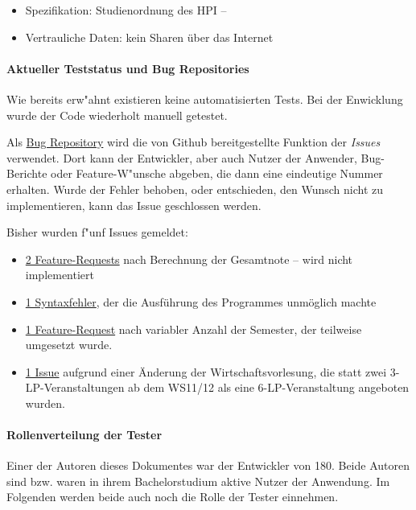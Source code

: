 \documentclass[ngerman]{article}
\begin{document}
\begin{itemize}
    \item
        Spezifikation: Studienordnung des HPI -- 
    \item
        Vertrauliche Daten: kein Sharen über das Internet
\end{itemize}

\paragraph{Aktueller Teststatus und Bug Repositories}

Wie bereits erw"ahnt existieren keine automatisierten Tests.
Bei der Enwicklung wurde der Code wiederholt manuell getestet.

Als \href{https://github.com/knub/onehundredandeighty/issues?q=is:issue}{Bug Repository} wird die von Github bereitgestellte Funktion der \emph{Issues} verwendet.
Dort kann der Entwickler, aber auch Nutzer der Anwender, Bug-Berichte oder Feature-W"unsche abgeben, die dann eine eindeutige Nummer erhalten.
Wurde der Fehler behoben, oder entschieden, den Wunsch nicht zu implementieren, kann das Issue geschlossen werden.

Bisher wurden f"unf Issues gemeldet:
\begin{itemize}
    \item
        \href{https://github.com/knub/onehundredandeighty/issues/30}{2 Feature-Requests} nach Berechnung der Gesamtnote -- wird nicht implementiert
    \item
        \href{https://github.com/knub/onehundredandeighty/issues/20}{1 Syntaxfehler}, der die Ausführung des Programmes unmöglich machte
    \item
        \href{https://github.com/knub/onehundredandeighty/issues/4}{1 Feature-Request} nach variabler Anzahl der Semester, der teilweise umgesetzt wurde.
    \item
        \href{https://github.com/knub/onehundredandeighty/pull/5}{1 Issue} aufgrund einer Änderung der Wirtschaftsvorlesung, die statt zwei 3-LP-Veranstaltungen ab dem WS11/12 als eine 6-LP-Veranstaltung angeboten wurden.
\end{itemize}

\paragraph{Rollenverteilung der Tester}

Einer der Autoren dieses Dokumentes war der Entwickler von 180.
Beide Autoren sind bzw. waren in ihrem Bachelorstudium aktive Nutzer der Anwendung.
Im Folgenden werden beide auch noch die Rolle der Tester einnehmen.
\end{document}
